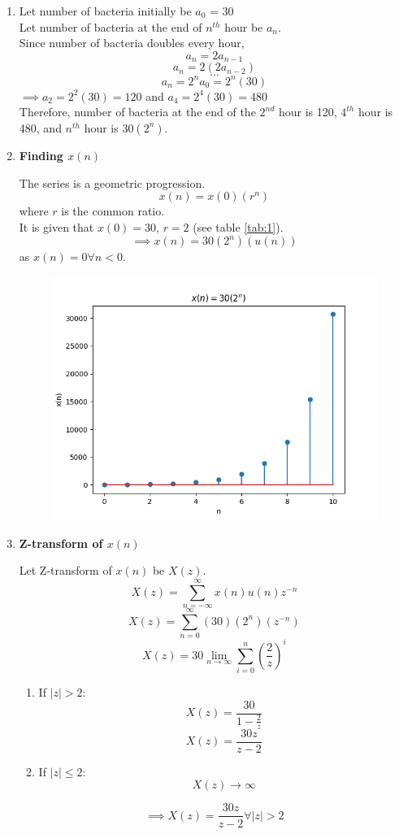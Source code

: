 \documentclass[journal,12pt,twocolumn]{IEEEtran}
\theoremstyle{remark}
\begin{document}
\begin{enumerate}
\item
Let number of bacteria initially be $a_0$ = 30
\\
Let number of bacteria at the end of $n^{th}$ hour be $a_n$.
\\
Since number of bacteria doubles every hour, \[a_n = 2a_{n - 1}\]
\[a_n = 2(2a_{n - 2})\]
\[\dots\]
\[a_n = 2^na_0 = 2^n(30)\]
$\implies a_2 = 2^2(30) = 120$ and $a_4 = 2^4(30) = 480$
\\

Therefore, number of bacteria at the end of the $2^{nd}$ hour is 120, $4^{th}$ hour is 480, and $n^{th}$ hour is $30(2^n)$.

\item \textbf{Finding $x(n)$}

The series is a geometric progression.
\[x(n) = x(0) (r^{n})\]
where $r$ is the common ratio.\\
It is given that $x(0) = 30$, $r = 2$ (see table \ref{tab:1}).
\[\implies x(n) = 30(2^n)(u(n))\]
as $x(n) = 0 \forall n < 0$.

\begin{figure}[h!]
    \centering
    \includegraphics[width=\columnwidth]{figs/11_9_3_30.png}
\end{figure}


\item \textbf{Z-transform of $x(n)$}

Let Z-transform of $x(n)$ be $X(z)$.
\[X(z) = \sum_{n = -\infty}^{\infty} x(n)u(n)z^{-n}\]
\[X(z) = \sum_{n = 0}^{\infty} (30)(2^n)(z^{-n})\]
\[X(z) = 30\lim_{n\to\infty}\sum_{i = 0}^{n}(\frac{2}{z})^i\]

\begin{enumerate}
\item If $|z| > 2$:
\[X(z) = \frac{30}{1 - \frac{2}{z}}\]
\[X(z) = \frac{30z}{z - 2}\]

\item If $|z| \le 2$:
\[X(z) \to \infty\]

\end{enumerate}

\[\implies X(z) = \frac{30z}{z - 2} \forall |z| > 2\]

\end{enumerate}
\end{document}
